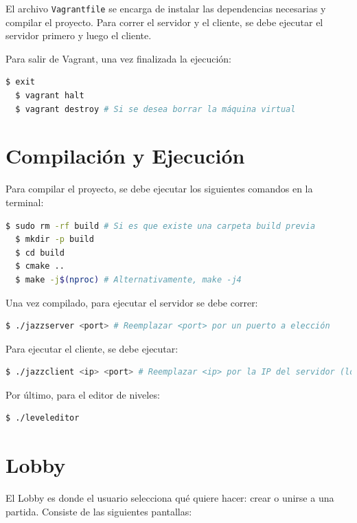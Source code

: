 \documentclass[titlepage,a4paper]{article}
\begin{document}
El archivo \texttt{Vagrantfile} se encarga de instalar las dependencias necesarias y compilar el proyecto. Para correr el servidor y el cliente, se debe ejecutar el servidor primero y luego el cliente.

Para salir de Vagrant, una vez finalizada la ejecución:

\begin{lstlisting}[language=sh,caption=Salir de Vagrant, captionpos=b]
  $ exit
  $ vagrant halt
  $ vagrant destroy # Si se desea borrar la máquina virtual
\end{lstlisting}

\section{Compilación y Ejecución}
Para compilar el proyecto, se debe ejecutar los siguientes comandos en la terminal:

\begin{lstlisting}[language=sh,caption=Compilación del Proyecto, captionpos=b]
  $ sudo rm -rf build # Si es que existe una carpeta build previa
  $ mkdir -p build
  $ cd build
  $ cmake ..
  $ make -j$(nproc) # Alternativamente, make -j4
\end{lstlisting}

Una vez compilado, para ejecutar el servidor se debe correr:

\begin{lstlisting}[language=sh,caption=Ejecución del Servidor, captionpos=b]
  $ ./jazzserver <port> # Reemplazar <port> por un puerto a elección
\end{lstlisting}

Para ejecutar el cliente, se debe ejecutar:

\begin{lstlisting}[language=sh,caption=Ejecución del Cliente, captionpos=b]
  $ ./jazzclient <ip> <port> # Reemplazar <ip> por la IP del servidor (localhost) y <port> por el puerto
\end{lstlisting}

Por último, para el editor de niveles:

\begin{lstlisting}[language=sh,caption=Ejecución del Editor de Niveles, captionpos=b]
  $ ./leveleditor
\end{lstlisting}

\section{Lobby}
El Lobby es donde el usuario selecciona qué quiere hacer: crear o unirse a una partida. Consiste de las siguientes pantallas:
\end{document}
